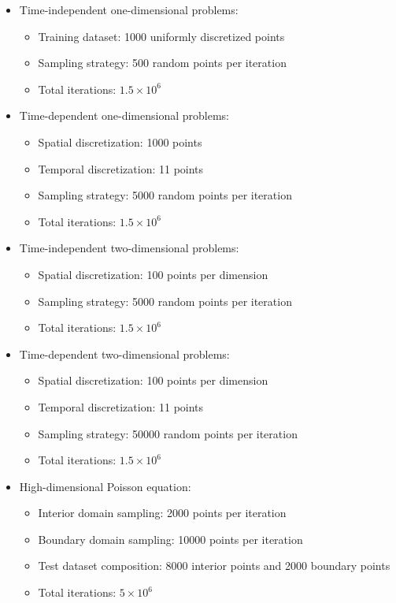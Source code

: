\begin{itemize}
    \item Time-independent one-dimensional problems:
    \begin{itemize}
        \item Training dataset: 1000 uniformly discretized points
        \item Sampling strategy: 500 random points per iteration
        \item Total iterations: $1.5 \times 10^6$
    \end{itemize}
    
    \item Time-dependent one-dimensional problems:
    \begin{itemize}
        \item Spatial discretization: 1000 points
        \item Temporal discretization: 11 points
        \item Sampling strategy: 5000 random points per iteration
        \item Total iterations: $1.5 \times 10^6$
    \end{itemize}
    
    \item Time-independent two-dimensional problems:
    \begin{itemize}
        \item Spatial discretization: 100 points per dimension
        \item Sampling strategy: 5000 random points per iteration
        \item Total iterations: $1.5 \times 10^6$
    \end{itemize}
    
    \item Time-dependent two-dimensional problems:
    \begin{itemize}
        \item Spatial discretization: 100 points per dimension
        \item Temporal discretization: 11 points
        \item Sampling strategy: 50000 random points per iteration
        \item Total iterations: $1.5 \times 10^6$
    \end{itemize}
    
    \item High-dimensional Poisson equation:
    \begin{itemize}
        \item Interior domain sampling: 2000 points per iteration
        \item Boundary domain sampling: 10000 points per iteration
        \item Test dataset composition: 8000 interior points and 2000 boundary points
        \item Total iterations: $5 \times 10^6$
    \end{itemize}
\end{itemize}

